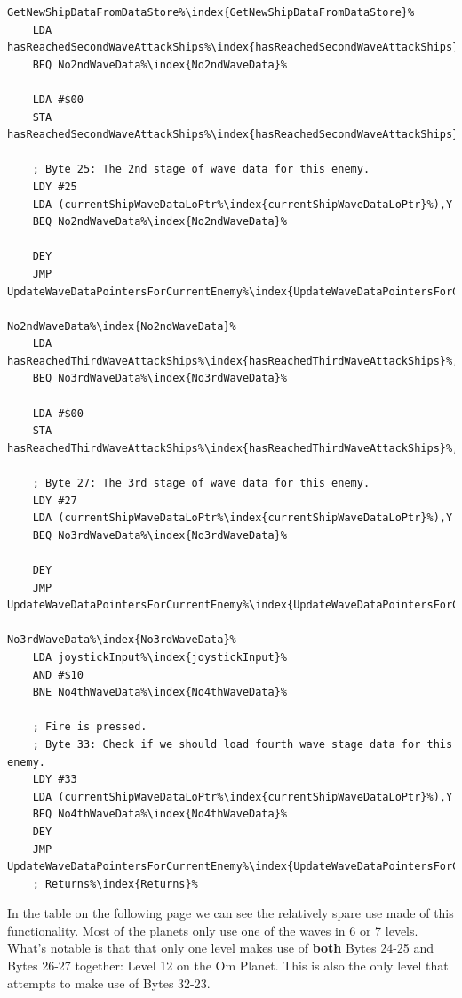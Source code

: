 \begin{lstlisting}[escapechar=\%]
GetNewShipDataFromDataStore%\index{GetNewShipDataFromDataStore}%
    LDA hasReachedSecondWaveAttackShips%\index{hasReachedSecondWaveAttackShips}%,X
    BEQ No2ndWaveData%\index{No2ndWaveData}%

    LDA #$00
    STA hasReachedSecondWaveAttackShips%\index{hasReachedSecondWaveAttackShips}%,X

    ; Byte 25: The 2nd stage of wave data for this enemy.
    LDY #25
    LDA (currentShipWaveDataLoPtr%\index{currentShipWaveDataLoPtr}%),Y
    BEQ No2ndWaveData%\index{No2ndWaveData}%

    DEY
    JMP UpdateWaveDataPointersForCurrentEnemy%\index{UpdateWaveDataPointersForCurrentEnemy}%

No2ndWaveData%\index{No2ndWaveData}%   
    LDA hasReachedThirdWaveAttackShips%\index{hasReachedThirdWaveAttackShips}%,X
    BEQ No3rdWaveData%\index{No3rdWaveData}%

    LDA #$00
    STA hasReachedThirdWaveAttackShips%\index{hasReachedThirdWaveAttackShips}%,X

    ; Byte 27: The 3rd stage of wave data for this enemy.
    LDY #27
    LDA (currentShipWaveDataLoPtr%\index{currentShipWaveDataLoPtr}%),Y
    BEQ No3rdWaveData%\index{No3rdWaveData}%

    DEY
    JMP UpdateWaveDataPointersForCurrentEnemy%\index{UpdateWaveDataPointersForCurrentEnemy}%

No3rdWaveData%\index{No3rdWaveData}%   
    LDA joystickInput%\index{joystickInput}%
    AND #$10
    BNE No4thWaveData%\index{No4thWaveData}%

    ; Fire is pressed.
    ; Byte 33: Check if we should load fourth wave stage data for this enemy.
    LDY #33
    LDA (currentShipWaveDataLoPtr%\index{currentShipWaveDataLoPtr}%),Y
    BEQ No4thWaveData%\index{No4thWaveData}%
    DEY
    JMP UpdateWaveDataPointersForCurrentEnemy%\index{UpdateWaveDataPointersForCurrentEnemy}%
    ; Returns%\index{Returns}%
\end{lstlisting}

In the table on the following page we can see the relatively spare use made of this functionality. Most of the
planets only use one of the waves in 6 or 7 levels. What's notable is that that only one level makes use of \textbf{both}
Bytes 24-25 and Bytes 26-27 together: Level 12 on the Om Planet. This is also the only level that attempts to make
use of Bytes 32-23. 

